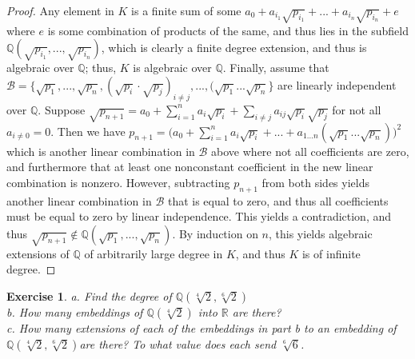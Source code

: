 \documentclass{article}
\newtheorem{exercise}{Exercise}
\begin{document}
\begin{proof}
  Any element in $K$ is a finite sum of some $a_{0} + a_{i_{1}}\sqrt{p_{i_{1}}} + ... + a_{i_{n}}\sqrt{p_{i_{n}}} + e$ where $e$ is some combination of products of the same, and thus lies in the subfield $\mathbb{Q}(\sqrt{p_{i_{1}}},...,\sqrt{p_{i_{n}}})$, which is clearly a finite degree extension, and thus is algebraic over $\mathbb{Q}$; thus, $K$ is algebraic over $\mathbb{Q}$. Finally, assume that $\mathscr{B} = \{\sqrt{p_{1}},...,\sqrt{p_{n}}, (\sqrt{p_{i}}\cdot \sqrt{p_{j}})_{i \neq j},...,(\sqrt{p_{1}}...\sqrt{p_{n}} \}$ are linearly independent over $\mathbb{Q}$. Suppose $\sqrt{p_{n+1}} = a_{0} + \sum_{i=1}^{n}a_{i}\sqrt{p_{i}} + \sum_{i \neq j}a_{ij}\sqrt{p_{i}}\sqrt{p_{j}}$ for not all $a_{i\neq 0} = 0$. Then we have $p_{n+1} = \big(a_{0} + \sum_{i=1}^{n}a_{i}\sqrt{p_{i}} + ... + a_{1...n}(\sqrt{p_{1}}...\sqrt{p_{n}})\big)^{2}$ which is another linear combination in $\mathscr{B}$ above where not all coefficients are zero, and furthermore that at least one nonconstant coefficient in the new linear combination is nonzero. However, subtracting $p_{n+1}$ from both sides yields another linear combination in $\mathscr{B}$ that is equal to zero, and thus all coefficients must be equal to zero by linear independence. This yields a contradiction, and thus $\sqrt{p_{n+1}} \notin \mathbb{Q}(\sqrt{p_{1}},...,\sqrt{p_{n}})$. By induction on $n$, this yields algebraic extensions of $\mathbb{Q}$ of arbitrarily large degree in $K$, and thus $K$ is of infinite degree. 
\end{proof}

\begin{exercise}
  a. Find the degree of $\mathbb{Q}(\sqrt[4]{2}, \sqrt[6]{2})$ \\
  b. How many embeddings of $\mathbb{Q}(\sqrt[4]{2})$ into $\mathbb{R}$ are there? \\
  c. How many extensions of each of the embeddings in part b to an embedding of $\mathbb{Q}(\sqrt[4]{2}, \sqrt[6]{2})$are there? To what value does each send $\sqrt[6]{6}$.
\end{exercise}
\end{document}

